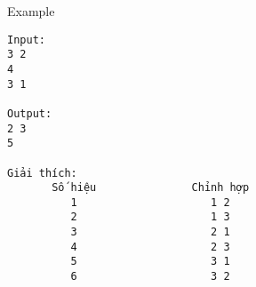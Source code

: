 Example
\begin{verbatim}
Input:
3 2 
4
3 1

Output:
2 3
5

Giải thích:
       Số hiệu               Chỉnh hợp
          1                     1 2
          2                     1 3
          3                     2 1
          4                     2 3
          5                     3 1
          6                     3 2

\end{verbatim}